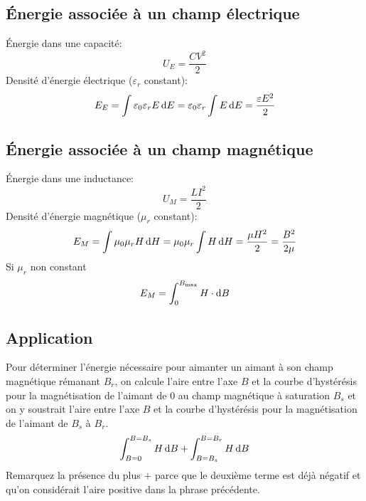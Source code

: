 \subsection{Énergie associée à un champ électrique}
Énergie dans une capacité:
\[ U_E = \frac{CV^2}{2} \]
Densité d'énergie électrique ($\varepsilon_r$ constant):
\[ E_E = \int \varepsilon_0 \varepsilon_r E \operatorname{d}\! E = \varepsilon_0 \varepsilon_r \int E \operatorname{d}\! E = \frac{\varepsilon E^2}{2} \]
\subsection{Énergie associée à un champ magnétique}
Énergie dans une inductance:
\[ U_M = \frac{LI^2}{2} \]
Densité d'énergie magnétique ($\mu_r$ constant):
\[ E_M = \int \mu_0 \mu_r H \operatorname{d}\! H = \mu_0 \mu_r \int H \operatorname{d}\! H = \frac{\mu H^2}{2} = \frac{B^2}{2\mu} \]
Si $\mu_r$ non constant
\[ E_M = \int_0^{B_\mathrm{max}} H \cdot \operatorname{d}\! B \]

\subsection{Application}
Pour déterminer l'énergie nécessaire pour aimanter un aimant à son champ magnétique rémanant $B_r$,
on calcule l'aire entre l'axe $B$ et la courbe d'hystérésis pour la magnétisation de l'aimant de 0 au champ magnétique à saturation $B_s$ et on y soustrait l'aire entre l'axe $B$ et la courbe d'hystérésis pour la magnétisation de l'aimant de $B_s$ à $B_r$.
\[ \int_{B = 0}^{B = B_s} H \operatorname{d}\! B + \int_{B = B_s}^{B = B_r} H \operatorname{d}\! B \]
Remarquez la présence du plus $+$ parce que le deuxième terme est déjà négatif et qu'on considérait l'aire positive dans la phrase précédente.

